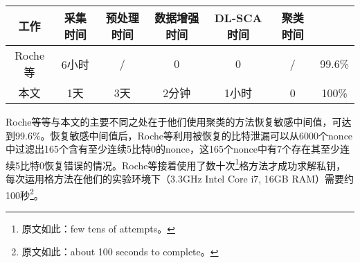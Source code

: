 {{{	\begin{table}[!h]
		\label{tab:improve}
		\centering
		\tiny%
		\begin{tabular}{c|cccccc}
			\hline
			工作&采集时间&预处理时间&数据增强时间&DL-SCA时间&聚类时间&\zyx\\
			\hline
			Roche等\citep{Roche21}&6小时&/&0&0&/&99.6\%\\
			本文&1天&3天&2分钟&1小时&0&100\%\\
			\hline
		\end{tabular}
	\end{table}

	
	
	Roche等\citep{Roche21}等与本文的主要不同之处在于他们使用聚类的方法恢复敏感中间值，\zyx 可达到99.6\%。恢复敏感中间值后，Roche等\citep{Roche21}利用被恢复的比特泄漏可以从6000个nonce中过滤出165个含有至少连续5比特0的nonce，这165个nonce中有7个存在其至少连续5比特0恢复错误的情况。Roche等\citep{Roche21}接着使用了数十次\footnote{原文如此：few tens of attempts。}格方法才成功求解私钥，每次运用格方法在他们的实验环境下（3.3GHz Intel Core i7, 16GB RAM）需要约100秒\footnote{原文如此：about 100 seconds to complete。}。
	
	
}}}
